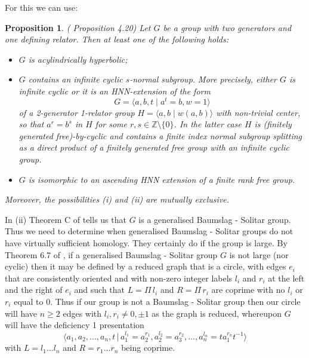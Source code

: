\documentclass[11pt,reqno]{amsart}
\numberwithin{equation}{section}
\newcommand{\Z}{\mathbb{Z}}
\newtheorem{prop}[thm]{Proposition}
\theoremstyle{definition}
\theoremstyle{remark}
\begin{document}
For this we can use:
\begin{prop} \label{1rel2gen} (\cite{motr} Proposition 4.20) 
Let $G$ be a group with two generators and one defining relator. Then at 
least one of the following holds:
\begin{itemize}
  \item[(i)] $G$ is acylindrically hyperbolic;
  \item[(ii)] $G$ contains an infinite cyclic $s$-normal subgroup.
  More precisely, either $G$ is infinite cyclic or it is an HNN-extension 
of the form $$G=\langle a,b, t\mid  a^t=b, w=1\rangle $$ of a 
2-generator 1-relator group
  $H= \langle a,b \mid w(a,b)\rangle $ with non-trivial center, so that 
$a^r=b^s$ in $H$ for some $r,s \in \Z \setminus\{0\}$. In the latter case $H$  
is (finitely generated free)-by-cyclic and contains a finite index normal 
subgroup splitting as a direct product  
of a finitely generated free group with an infinite cyclic group.
  \item[(iii)] $G$ is isomorphic to an ascending HNN extension
of a finite rank free group.
\end{itemize}
Moreover, the possibilities (i) and (ii) are mutually exclusive.
\end{prop}

In (ii) Theorem C of \cite{krp} tells us that $G$ is a generalised
Baumslag - Solitar group. Thus we need to determine when generalised
Baumslag - Solitar groups do not have virtually sufficient homology. They
certainly do if the group is large. By Theorem 6.7 of \cite{lvrf},
if a generalised Baumslag - Solitar group $G$ is not large (nor cyclic)
then it may be defined by a reduced
graph that is a circle, with edges $e_i$ that
are consistently oriented and with non-zero integer labels $l_i$ and
$r_i$ at the left and the right of $e_i$ and such that $L=\Pi\,l_i$ and
$R=\Pi\, r_i$ are coprime with no $l_i$ or $r_i$ equal to $0$.
Thus if our group is not a Baumslag - Solitar group
then our circle will have 
$n\geq 2$ edges with $l_i,r_i\neq 0,\pm 1$ as the graph is reduced,
whereupon
$G$ will have the deficiency 1 presentation
\[\langle a_1,a_2,\ldots ,a_n,t\,|\,
  a_1^{l_1}=a_2^{r_1}, a_2^{l_2}=a_3^{r_2}, \ldots, a_n^{l_n}
  =ta_1^{r_n}t^{-1}\rangle\]
with $L=l_1\ldots l_n$ and $R=r_1\ldots r_n$ being coprime.
\end{document}
